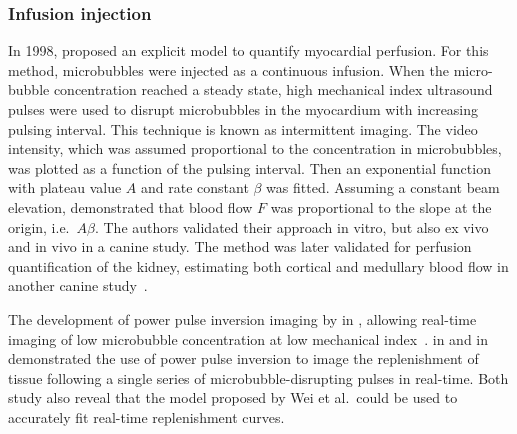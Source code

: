 \subsubsection{Infusion injection}
In 1998, \citet{Wei:1998jd} proposed an explicit model to quantify myocardial perfusion. %
For this method, microbubbles were injected as a continuous infusion.
When the micro-bubble concentration reached a steady state, high mechanical index ultrasound pulses were used to disrupt microbubbles in the myocardium with increasing pulsing interval.
This technique is known as intermittent imaging.
The video intensity, which was assumed proportional to the concentration in microbubbles, was plotted as a function of the pulsing interval. 
Then an exponential function with plateau value $A$ and rate constant $\beta$ was fitted. 
Assuming a constant beam elevation, \citet{Wei:1998jd} demonstrated that blood flow $F$ was proportional to the slope at the origin, i.e.~$A\beta$.
The authors validated their approach in vitro, but also ex vivo and in vivo in a canine study.
The method was later validated for perfusion quantification of the kidney, estimating both cortical and medullary blood flow in another canine study~\cite{Wei:2001id}. %

The development of power pulse inversion imaging by \citet{Simpson:1997jn} in \citeyear{Simpson:1997jn}, %
allowing real-time imaging of low microbubble concentration at low mechanical index~\cite{Tiemann:1999vy}. %
\citet{Tiemann:2000wn} in \citeyear{Tiemann:2000wn} %
and \citet{Masugata:2001vg} in \citeyear{Masugata:2001vg} %
demonstrated the use of power pulse inversion to image the replenishment of tissue following a single series of microbubble-disrupting pulses in real-time.
Both study also reveal that the model proposed by Wei et al.~could be used to accurately fit real-time replenishment curves.

